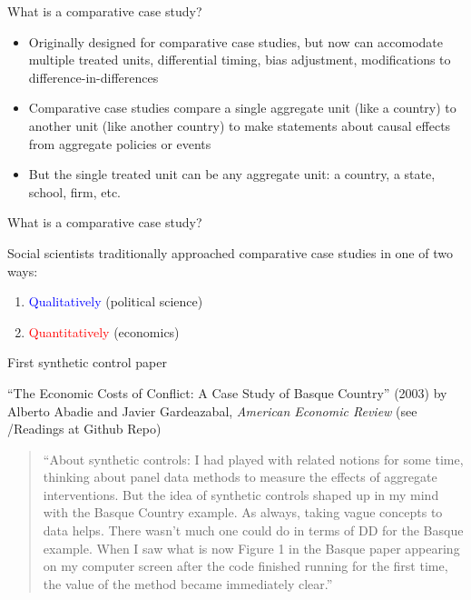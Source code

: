 \documentclass{beamer}
\begin{document}
	
\begin{frame}{What is a comparative case study?}

\begin{itemize}
\item Originally designed for comparative case studies, but now can accomodate multiple treated units, differential timing, bias adjustment, modifications to difference-in-differences
\item Comparative case studies compare a single aggregate unit (like a country) to another unit (like another country) to make statements about causal effects from aggregate policies or events
\item But the single treated unit can be any aggregate unit: a country, a state, school, firm, etc. 
\end{itemize}

\end{frame}

\begin{frame}{What is a comparative case study?}

 Social scientists traditionally approached comparative case studies in one of two ways:

	\begin{enumerate}
	\item \textcolor{blue}{Qualitatively} (political science)
	\item \textcolor{red}{Quantitatively} (economics)
	\end{enumerate}

\end{frame}



\begin{frame}{First synthetic control paper}

 
``The Economic Costs of Conflict: A Case Study of Basque Country'' (2003) by Alberto Abadie and Javier Gardeazabal, \emph{American Economic Review} (see /Readings at Github Repo)

\bigskip
\footnotesize
\begin{quote} ``About synthetic controls: I had played with related notions for some time, thinking about panel data methods to measure the effects of aggregate interventions. But the idea of synthetic controls shaped up in my mind with the Basque Country example. As always, taking vague concepts to data helps. There wasn’t much one could do in terms of DD for the Basque example. When I saw what is now Figure 1 in the Basque paper appearing on my computer screen after the code finished running for the first time, the value of the method became immediately clear.''
\end{quote}


\end{frame}
\end{document}

